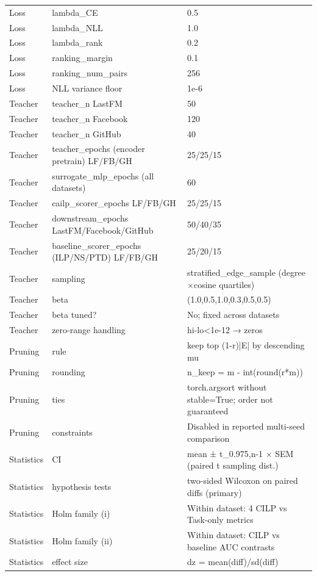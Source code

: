 \begin{center}
\begin{longtable}{@{}p{2.2cm}p{4.2cm}p{6.8cm}@{}}
Loss & lambda\_CE & 0.5 \\
Loss & lambda\_NLL & 1.0 \\
Loss & lambda\_rank & 0.2 \\
Loss & ranking\_margin & 0.1 \\
Loss & ranking\_num\_pairs & 256 \\
Loss & NLL variance floor & 1e-6 \\
Teacher & teacher\_n LastFM & 50 \\
Teacher & teacher\_n Facebook & 120 \\
Teacher & teacher\_n GitHub & 40 \\
Teacher & teacher\_epochs (encoder pretrain) LF/FB/GH & 25/25/15 \\
Teacher & surrogate\_mlp\_epochs (all datasets) & 60 \\
Teacher & cailp\_scorer\_epochs LF/FB/GH & 25/25/15 \\
Teacher & downstream\_epochs LastFM/Facebook/GitHub & 50/40/35 \\
Teacher & baseline\_scorer\_epochs (ILP/NS/PTD) LF/FB/GH & 25/20/15 \\
Teacher & sampling & stratified\_edge\_sample (degree$\times$cosine quartiles) \\
Teacher & beta & (1.0,0.5,1.0,0.3,0.5,0.5) \\
Teacher & beta tuned? & No; fixed across datasets \\
Teacher & zero-range handling & hi-lo<1e-12 → zeros \\
Pruning & rule & keep top (1-r)|E| by descending mu \\
Pruning & rounding & n\_keep = m - int(round(r*m)) \\
Pruning & ties & torch.argsort without stable=True; order not guaranteed \\
Pruning & constraints & Disabled in reported multi-seed comparison \\
Statistics & CI & mean ± t\_0.975,n-1 × SEM (paired t sampling dist.) \\
Statistics & hypothesis tests & two-sided Wilcoxon on paired diffs (primary) \\
Statistics & Holm family (i) & Within dataset: 4 CILP vs Task-only metrics \\
Statistics & Holm family (ii) & Within dataset: CILP vs baseline AUC contrasts \\
Statistics & effect size & dz = mean(diff)/sd(diff) \\
\bottomrule
\end{longtable}
\end{center}

